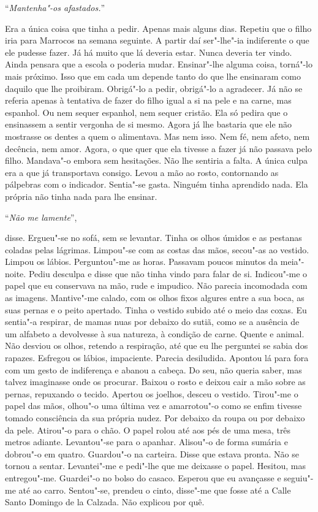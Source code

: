 ``\emph{Mantenha"-os afastados.}''

Era a única coisa que tinha a pedir. Apenas mais alguns dias. Repetiu
que o filho iria para Marrocos na semana seguinte. A partir daí
ser"-lhe"-ia indiferente o que ele pudesse fazer. Já há muito que lá
deveria estar. Nunca deveria ter vindo. Ainda pensara que a escola o
poderia mudar. Ensinar"-lhe alguma coisa, torná"-lo mais próximo. Isso
que em cada um depende tanto do que lhe ensinaram como daquilo que lhe
proibiram. Obrigá"-lo a pedir, obrigá"-lo a agradecer. Já não se referia
apenas à tentativa de fazer do filho igual a si na pele e na carne, mas
espanhol. Ou nem sequer espanhol, nem sequer cristão. Ela só pedira que
o ensinassem a sentir vergonha de si mesmo. Agora já lhe bastaria que
ele não mostrasse os dentes a quem o alimentava. Mas nem isso. Nem fé,
nem afeto, nem decência, nem amor. Agora, o que quer que ela tivesse a
fazer já não passava pelo filho. Mandava"-o embora sem hesitações. Não
lhe sentiria a falta. A única culpa era a que já transportava consigo.
Levou a mão ao rosto, contornando as pálpebras com o indicador.
Sentia"-se gasta. Ninguém tinha aprendido nada. Ela própria não tinha
nada para lhe ensinar.

``\emph{Não me lamente}'',

disse. Ergueu"-se no sofá, sem se levantar. Tinha os olhos úmidos e as
pestanas coladas pelas lágrimas. Limpou"-se com as costas das mãos,
secou"-as ao vestido. Limpou os lábios. Perguntou"-me as horas. Passavam
poucos minutos da meia"-noite. Pediu desculpa e disse que não tinha
vindo para falar de si. Indicou"-me o papel que eu conservava na mão,
rude e impudico. Não parecia incomodada com as imagens. Mantive"-me
calado, com os olhos fixos algures entre a sua boca, as suas pernas e o
peito apertado. Tinha o vestido subido até o meio das coxas. Eu
sentia"-a respirar, de mamas nuas por debaixo do sutiã, como se a
ausência de um alfabeto a devolvesse à sua natureza, à condição de
carne. Quente e animal. Não desviou os olhos, retendo a respiração, até
que eu lhe perguntei se sabia dos rapazes. Esfregou os lábios,
impaciente. Parecia desiludida. Apontou lá para fora com um gesto de
indiferença e abanou a cabeça. Do seu, não queria saber, mas talvez
imaginasse onde os procurar. Baixou o rosto e deixou cair a mão sobre as
pernas, repuxando o tecido. Apertou os joelhos, desceu o vestido.
Tirou"-me o papel das mãos, olhou"-o uma última vez e amarrotou"-o como
se enfim tivesse tomado consciência da sua própria nudez. Por debaixo da
roupa ou por debaixo da pele. Atirou"-o para o chão. O papel rolou até
aos pés de uma mesa, três metros adiante. Levantou"-se para o apanhar.
Alisou"-o de forma sumária e dobrou"-o em quatro. Guardou"-o na
carteira. Disse que estava pronta. Não se tornou a sentar. Levantei"-me
e pedi"-lhe que me deixasse o papel. Hesitou, mas entregou"-me.
Guardei"-o no bolso do casaco. Esperou que eu avançasse e seguiu"-me até
ao carro. Sentou"-se, prendeu o cinto, disse"-me que fosse até a Calle
Santo Domingo de la Calzada. Não explicou por quê.

